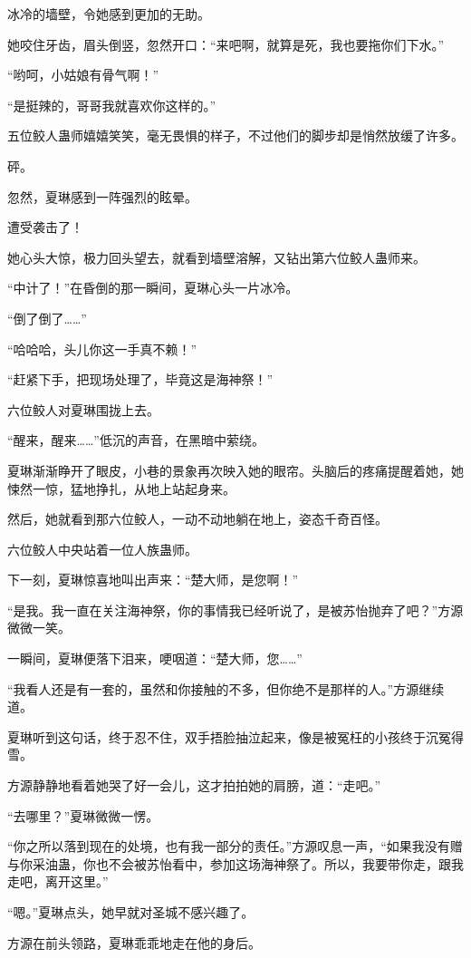 \begin{this_body}
冰冷的墙壁，令她感到更加的无助。

她咬住牙齿，眉头倒竖，忽然开口：“来吧啊，就算是死，我也要拖你们下水。”

“哟呵，小姑娘有骨气啊！”

“是挺辣的，哥哥我就喜欢你这样的。”

五位鲛人蛊师嬉嬉笑笑，毫无畏惧的样子，不过他们的脚步却是悄然放缓了许多。

砰。

忽然，夏琳感到一阵强烈的眩晕。

遭受袭击了！

她心头大惊，极力回头望去，就看到墙壁溶解，又钻出第六位鲛人蛊师来。

“中计了！”在昏倒的那一瞬间，夏琳心头一片冰冷。

“倒了倒了……”

“哈哈哈，头儿你这一手真不赖！”

“赶紧下手，把现场处理了，毕竟这是海神祭！”

六位鲛人对夏琳围拢上去。

“醒来，醒来……”低沉的声音，在黑暗中萦绕。

夏琳渐渐睁开了眼皮，小巷的景象再次映入她的眼帘。头脑后的疼痛提醒着她，她悚然一惊，猛地挣扎，从地上站起身来。

然后，她就看到那六位鲛人，一动不动地躺在地上，姿态千奇百怪。

六位鲛人中央站着一位人族蛊师。

下一刻，夏琳惊喜地叫出声来：“楚大师，是您啊！”

“是我。我一直在关注海神祭，你的事情我已经听说了，是被苏怡抛弃了吧？”方源微微一笑。

一瞬间，夏琳便落下泪来，哽咽道：“楚大师，您……”

“我看人还是有一套的，虽然和你接触的不多，但你绝不是那样的人。”方源继续道。

夏琳听到这句话，终于忍不住，双手捂脸抽泣起来，像是被冤枉的小孩终于沉冤得雪。

方源静静地看着她哭了好一会儿，这才拍拍她的肩膀，道：“走吧。”

“去哪里？”夏琳微微一愣。

“你之所以落到现在的处境，也有我一部分的责任。”方源叹息一声，“如果我没有赠与你采油蛊，你也不会被苏怡看中，参加这场海神祭了。所以，我要带你走，跟我走吧，离开这里。”

“嗯。”夏琳点头，她早就对圣城不感兴趣了。

方源在前头领路，夏琳乖乖地走在他的身后。


\end{this_body}
